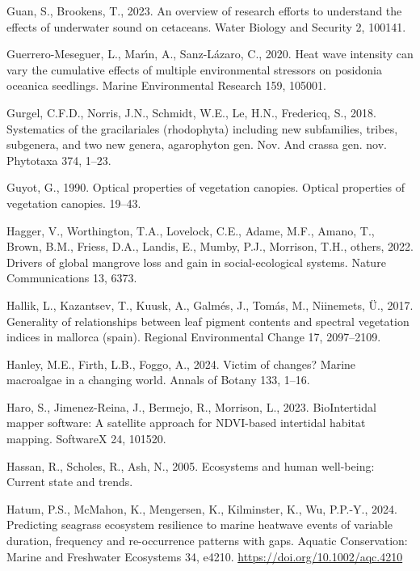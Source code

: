 \documentclass[
  letterpaper,
  11pt,
  english,
  singlespacing,
  headsepline]{MastersDoctoralThesis}
\newlength{\cslhangindent}
\newenvironment{CSLReferences}[2] %
 {\begin{list}{}{%
  \setlength{\itemindent}{0pt}
  \setlength{\leftmargin}{0pt}
  \setlength{\parsep}{0pt}
  \ifodd #1
   \setlength{\leftmargin}{\cslhangindent}
   \setlength{\itemindent}{-1\cslhangindent}
  \fi
  \setlength{\itemsep}{#2\baselineskip}}}
 {\end{list}}
\begin{document}
\begin{CSLReferences}{1}{0}
Guan, S., Brookens, T., 2023. An overview of research efforts to
understand the effects of underwater sound on cetaceans. Water Biology
and Security 2, 100141.

Guerrero-Meseguer, L., Marı́n, A., Sanz-Lázaro, C., 2020. Heat wave
intensity can vary the cumulative effects of multiple environmental
stressors on posidonia oceanica seedlings. Marine Environmental Research
159, 105001.

Gurgel, C.F.D., Norris, J.N., Schmidt, W.E., Le, H.N., Fredericq, S.,
2018. Systematics of the gracilariales (rhodophyta) including new
subfamilies, tribes, subgenera, and two new genera, agarophyton gen.
Nov. And crassa gen. nov. Phytotaxa 374, 1--23.

Guyot, G., 1990. Optical properties of vegetation canopies. Optical
properties of vegetation canopies. 19--43.

Hagger, V., Worthington, T.A., Lovelock, C.E., Adame, M.F., Amano, T.,
Brown, B.M., Friess, D.A., Landis, E., Mumby, P.J., Morrison, T.H.,
others, 2022. Drivers of global mangrove loss and gain in
social-ecological systems. Nature Communications 13, 6373.

Hallik, L., Kazantsev, T., Kuusk, A., Galmés, J., Tomás, M., Niinemets,
Ü., 2017. Generality of relationships between leaf pigment contents and
spectral vegetation indices in mallorca (spain). Regional Environmental
Change 17, 2097--2109.

Hanley, M.E., Firth, L.B., Foggo, A., 2024. Victim of changes? Marine
macroalgae in a changing world. Annals of Botany 133, 1--16.

Haro, S., Jimenez-Reina, J., Bermejo, R., Morrison, L., 2023.
BioIntertidal mapper software: A satellite approach for NDVI-based
intertidal habitat mapping. SoftwareX 24, 101520.

Hassan, R., Scholes, R., Ash, N., 2005. Ecosystems and human well-being:
Current state and trends.

Hatum, P.S., McMahon, K., Mengersen, K., Kilminster, K., Wu, P.P.-Y.,
2024. Predicting seagrass ecosystem resilience to marine heatwave events
of variable duration, frequency and re-occurrence patterns with gaps.
Aquatic Conservation: Marine and Freshwater Ecosystems 34, e4210.
\url{https://doi.org/10.1002/aqc.4210}


\end{CSLReferences}
\end{document}
